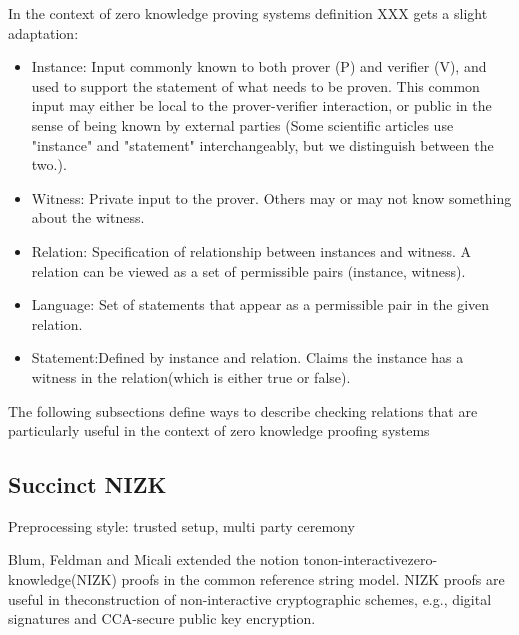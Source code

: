 In the context of zero knowledge proving systems definition XXX gets a slight adaptation:
\begin{itemize}
\item Instance: Input commonly known to both prover (P) and verifier (V), and used to support the statement of what needs to be proven. This common input may either be local to the prover-verifier interaction, or public in the sense of being known by external parties (Some scientific articles use "instance" and "statement" interchangeably, but we distinguish between the two.).
\item Witness: Private input to the prover. Others may or may not know something about the witness.
\item Relation: Specification of relationship between instances and witness. A relation can be viewed as a set of permissible pairs (instance, witness).
\item Language: Set of statements that appear as a permissible pair in the given relation.
\item Statement:Defined by instance and relation. Claims the instance has a witness in the relation(which is either true or false).
\end{itemize}

The following subsections define ways to describe checking relations that are particularly useful in the context of zero knowledge proofing systems

\subsection{Succinct NIZK}
Preprocessing style: trusted setup, multi party ceremony

Blum, Feldman and Micali
 extended the notion tonon-interactivezero-knowledge(NIZK)  proofs in the  common  reference  string  model.  NIZK  proofs  are  useful  in  theconstruction of non-interactive cryptographic schemes, e.g., digital signatures and CCA-secure public key encryption.
 
